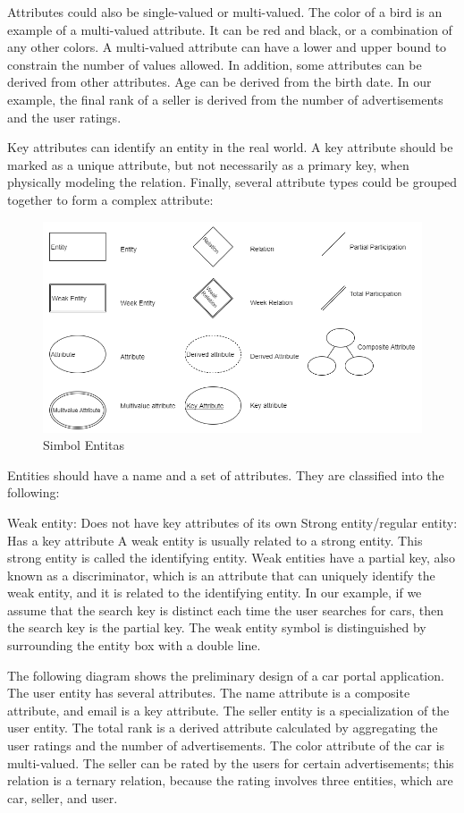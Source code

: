 \documentclass[]{book}
\begin{document}
Attributes could also be single-valued or multi-valued. The color of a bird is an example of a multi-valued attribute. It can be red and black, or a combination of any other colors. A multi-valued attribute can have a lower and upper bound to constrain the number of values allowed. In addition, some attributes can be derived from other attributes. Age can be derived from the birth date. In our example, the final rank of a seller is derived from the number of advertisements and the user ratings.

Key attributes can identify an entity in the real world. A key attribute should be marked as a unique attribute, but not necessarily as a primary key, when physically modeling the relation. Finally, several attribute types could be grouped together to form a complex attribute:

\begin{figure}

{\centering \includegraphics[width=0.7\linewidth]{img/01/db_model1} 

}

\caption{Simbol Entitas }\label{fig:fig11}
\end{figure}

Entities should have a name and a set of attributes. They are classified into the following:

Weak entity: Does not have key attributes of its own
Strong entity/regular entity: Has a key attribute
A weak entity is usually related to a strong entity. This strong entity is called the identifying entity. Weak entities have a partial key, also known as a discriminator, which is an attribute that can uniquely identify the weak entity, and it is related to the identifying entity. In our example, if we assume that the search key is distinct each time the user searches for cars, then the search key is the partial key. The weak entity symbol is distinguished by surrounding the entity box with a double line.

The following diagram shows the preliminary design of a car portal application. The user entity has several attributes. The name attribute is a composite attribute, and email is a key attribute. The seller entity is a specialization of the user entity. The total rank is a derived attribute calculated by aggregating the user ratings and the number of advertisements. The color attribute of the car is multi-valued. The seller can be rated by the users for certain advertisements; this relation is a ternary relation, because the rating involves three entities, which are car, seller, and user.
\end{document}
